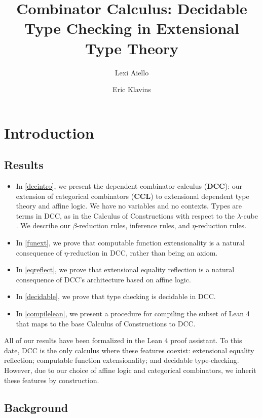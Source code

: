 \documentclass{article}
\title{Combinator Calculus: Decidable Type Checking in Extensional Type Theory}
\author[1]{Lexi Aiello}
\author[2]{Eric Klavins}
\affil[1]{Department of Philosophy, University of Washington}
\affil[2]{Electrical \& Computer Engineering Department, University of Washington}
\newcommand{\dccbf}{\(\textbf{DCC}\)}
\newcommand{\cclbf}{\(\textbf{CCL}\)} %
\begin{document}
\maketitle

\section{Introduction}

\subsection{Results}

\begin{itemize}
  \item In \ref{dccintro}, we present the dependent combinator calculus (\dccbf): our extension of categorical combinators (\cclbf) \autocite{cmachine} \autocite{CURIEN1986188} to extensional dependent type theory and affine logic. We have no variables and no contexts. Types are terms in DCC, as in the Calculus of Constructions with respect to the \(\lambda\)-cube \autocite{Barendregt_1991}. We describe our \(\beta\)-reduction rules, inference rules, and \(\eta\)-reduction rules.
  \item In \ref{funext}, we prove that computable function extensionality is a natural consequence of \(\eta\)-reduction in DCC, rather than being an axiom.
  \item In \ref{eqreflect}, we prove that extensional equality reflection is a natural consequence of DCC's architecture based on affine logic.
  \item In \ref{decidable}, we prove that type checking is decidable in DCC.
  \item In \ref{compilelean}, we present a procedure for compiling the subset of Lean 4 that maps to the base Calculus of Constructions to DCC.
\end{itemize}

All of our results have been formalized in the Lean 4 proof assistant. To this date, DCC is the only calculus where these features coexist: extensional equality reflection; computable function extensionality; and decidable type-checking. However, due to our choice of affine logic and categorical combinators, we inherit these features by construction.

\subsection{Background}
\end{document}
